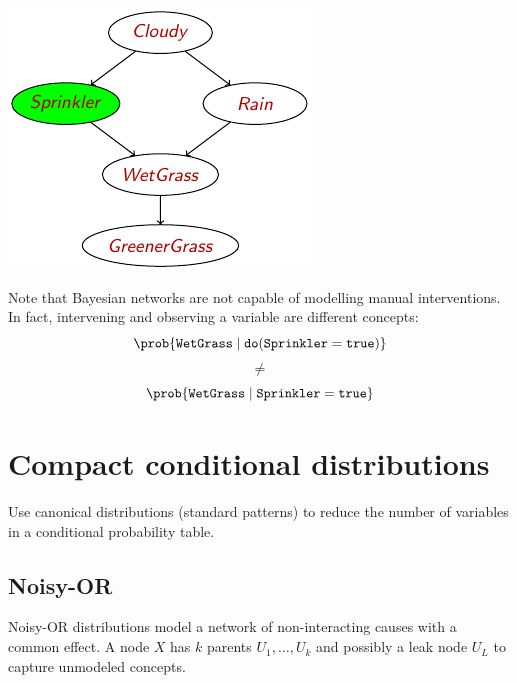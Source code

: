 \begin{description}
\begin{example}
            \begin{minipage}{.3\linewidth}
                \centering
                \includegraphics[width=\linewidth]{img/_do_operator_example2.pdf}
            \end{minipage}
            \begin{minipage}{.65\linewidth}
                Note that Bayesian networks are not capable of modelling manual interventions.
                In fact, intervening and observing a variable are different concepts:
                \[ \prob{\texttt{WetGrass} \mid \texttt{do}(\texttt{Sprinkler} = \texttt{true})} \]
                \[ \neq \]
                \[ \prob{\texttt{WetGrass} \mid \texttt{Sprinkler} = \texttt{true}} \]
            \end{minipage}
        \end{example}
\end{description}



\section{Compact conditional distributions}

Use canonical distributions (standard patterns) to reduce 
the number of variables in a conditional probability table.


\subsection{Noisy-OR}
Noisy-OR distributions model a network of non-interacting causes with a common effect.
A node $X$ has $k$ parents $U_1, \dots, U_k$ and possibly a leak node $U_L$ to capture unmodeled concepts. 

